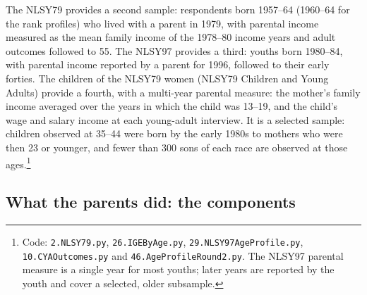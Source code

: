 The NLSY79 provides a second sample: respondents born 1957--64 (1960--64 for the rank profiles) who lived with a
parent in 1979, with parental income
measured as the mean family income of the 1978--80 income years and adult outcomes followed to 55. The NLSY97 provides
a third: youths born 1980--84, with parental income reported by a parent for 1996, followed to their early forties. The
children of the NLSY79 women (NLSY79 Children and Young Adults) provide a fourth, with a multi-year parental measure:
the mother's family income averaged over the years in which the child was 13--19, and the child's wage and salary
income at each young-adult interview. It is a selected sample: children observed at 35--44 were born by the early
1980s to mothers who were then 23 or younger, and fewer than 300 sons of each race are observed at those
ages.\footnote{Code: \texttt{2.NLSY79.py}, \texttt{26.IGEByAge.py}, \texttt{29.NLSY97AgeProfile.py},
\texttt{10.CYAOutcomes.py} and \texttt{46.AgeProfileRound2.py}. The NLSY97 parental measure is a single year
for most youths; later years are reported by the youth and cover a selected, older subsample.}

\subsection{What the parents did: the components}

